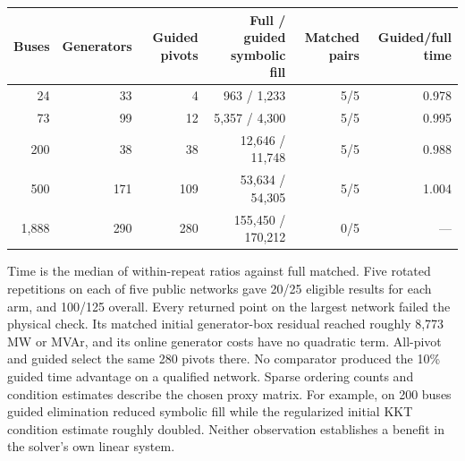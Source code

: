 \documentclass[10pt,letterpaper]{article}
\begin{document}
\begin{center}\small
\begin{tabular}{@{}rrrrrr@{}}
\toprule
Buses & Generators & Guided pivots & Full / guided symbolic fill & Matched pairs & Guided/full time\\\midrule
24 &33&4&963 / 1,233&5/5&0.978\\
73 &99&12&5,357 / 4,300&5/5&0.995\\
200&38&38&12,646 / 11,748&5/5&0.988\\
500&171&109&53,634 / 54,305&5/5&1.004\\
1,888&290&280&155,450 / 170,212&0/5&---\\\bottomrule
\end{tabular}
\end{center}
Time is the median of within-repeat ratios against full matched. Five rotated repetitions on each of five public networks gave 20/25 eligible results for each arm, and 100/125 overall. Every returned point on the largest network failed the physical check. Its matched initial generator-box residual reached roughly 8,773 MW or MVAr, and its online generator costs have no quadratic term. All-pivot and guided select the same 280 pivots there. No comparator produced the 10\% guided time advantage on a qualified network. Sparse ordering counts and condition estimates describe the chosen proxy matrix. For example, on 200 buses guided elimination reduced symbolic fill while the regularized initial KKT condition estimate roughly doubled. Neither observation establishes a benefit in the solver's own linear system.
\end{document}
